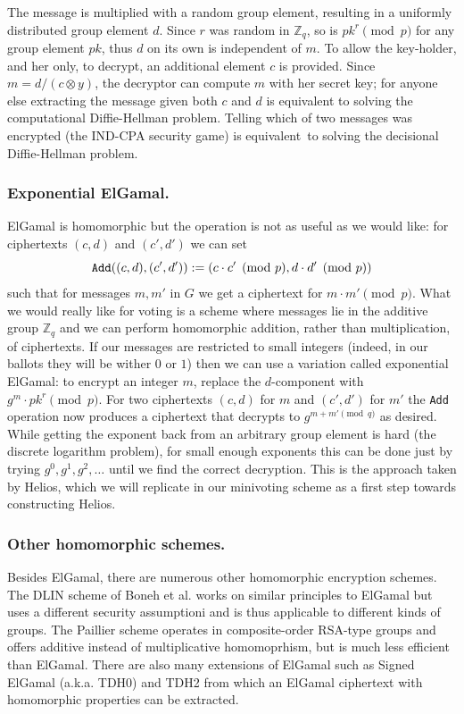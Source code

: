\documentclass[envcountsame]{llncs}
\newcommand{\alg}[1]{\textup{\texttt{#1}}}
\newenvironment{helios}{\begin{framed}
\vspace{-18pt}
\begin{figure}
\vspace{-12pt}\quad{\Huge \Sun}
\end{figure}}{\end{framed}}
\begin{document}
The message is multiplied with a random group element, resulting in a uniformly
distributed group element $d$. Since $r$ was random in $\mathbb Z_q$, so is
$pk^r \pmod{p}$ for any group element $pk$, thus $d$ on its own is independent
of $m$. To allow the key-holder, and her only, to decrypt, an additional element
$c$ is provided. Since $m = d/(c \otimes y)$, the decryptor can compute $m$ with
her secret key; for anyone else extracting the message given both $c$ and $d$ is
equivalent to solving the computational Diffie-Hellman problem. Telling which of
two messages was encrypted (the IND-CPA security game) is
equivalent\footnotemark\ to solving the decisional Diffie-Hellman problem.

\begin{helios}
\subsubsection{Exponential ElGamal.}
ElGamal is homomorphic but the operation is not as useful as we would like:
for ciphertexts $(c, d)$ and $(c', d')$ we can set
\[
\alg{Add}((c, d), (c', d')) := (c \cdot c' \pmod{p}, d \cdot d' \pmod{p})
\]
such that for messages $m, m'$ in $G$ we get a ciphertext for $m \cdot m'
\pmod{p}$. What we would really like for voting is a scheme where messages lie
in the additive group $\mathbb Z_q$ and we can perform homomorphic addition,
rather than multiplication, of ciphertexts. If our messages are restricted to
small integers (indeed, in our ballots they will be wither $0$ or $1$) then we
can use a variation called exponential ElGamal: to encrypt an integer $m$,
replace the $d$-component with $g^m \cdot pk^r \pmod{p}$. For two ciphertexts
$(c, d)$ for $m$ and $(c', d')$ for $m'$ the \alg{Add} operation now produces a
ciphertext that decrypts to $g^{m + m' \pmod{q}}$ as desired. While getting the
exponent back from an arbitrary group element is hard (the discrete logarithm
problem), for small enough exponents this can be done just by trying $g^0, g^1,
g^2, \ldots$ until we find the correct decryption. This is the approach taken by
Helios, which we will replicate in our minivoting scheme as a first step towards
constructing Helios.
\end{helios}

\subsubsection{Other homomorphic schemes.}
Besides ElGamal, there are numerous other homomorphic encryption schemes.
The DLIN scheme of Boneh et al. \cite {BBS04} works on similar principles to
ElGamal but uses a different security assumptioni and is thus applicable to
different kinds of groups. The Paillier scheme \cite{P99} operates in
composite-order RSA-type groups and offers additive instead of multiplicative
homomoprhism, but is much less efficient than ElGamal. There are also many
extensions of ElGamal such as Signed ElGamal (a.k.a. TDH0) and TDH2 \cite{SG98}
from which an ElGamal ciphertext with homomorphic properties can be extracted.
\end{document}
